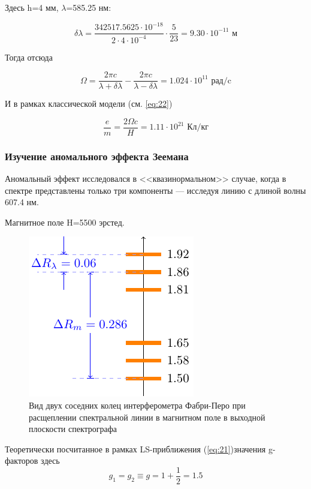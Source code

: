 Здесь h=4 мм,  $\lambda$=585.25 нм:

\begin{equation}
 	\delta \lambda=\frac{342517.5625\cdot10^{-18}}{2\cdot4\cdot10^{-4}}\cdot\frac{5}{23}=9.30\cdot10^{-11} \text{ м}
 \end{equation} 

Тогда отсюда

\begin{equation}
	\Omega=\frac{2\pi c}{\lambda+\delta \lambda}-\frac{2\pi c}{\lambda-\delta \lambda}=1.024\cdot10^{11} \text{ рад/c}
\end{equation}

И в рамках классической модели (см. \ref{eq:22})

\begin{equation}
	\frac{e}{m}=\frac{2\Omega c}{H}=1.11\cdot10^{21} \text{ Кл/кг}
\end{equation}

\subsubsection{Изучение аномального эффекта Зеемана}

Аномальный эффект исследовался в <<квазинормальном>> случае, когда в спектре представлены только три компоненты --- исследуя линию с  длиной волны  607.4 нм.

Магнитное поле H=5500 эрстед.

\begin{figure}[H]
	\centering
	\includegraphics[scale=1]{ris/3b}
	\caption{Вид двух соседних колец интерферометра Фабри-Перо при расщеплении спектральной линии в магнитном поле в выходной плоскости спектрографа}
	\label{fig:ris3b}
\end{figure}

Теоретически посчитанное в рамках LS-приближения (\ref{eq:21})значения  g-факторов здесь
\begin{equation}
	g_1=g_2\equiv g=1+\frac12=1.5
\end{equation}

